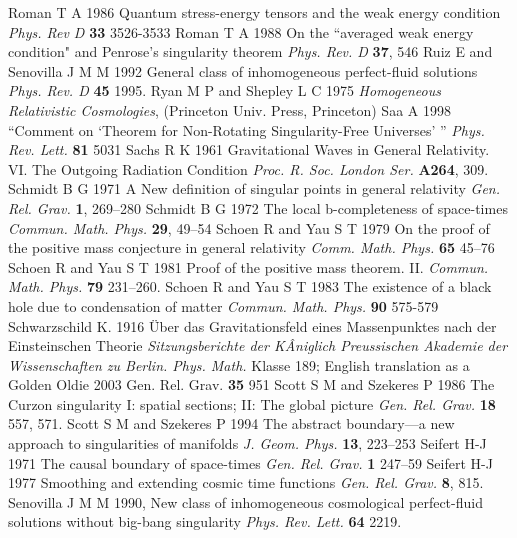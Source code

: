 \documentclass[12pt]{iopart}
\begin{document}
\begin{thebibliography}{999}
 Roman T A 1986 Quantum stress-energy tensors and the weak energy condition {\it Phys. Rev D} {\bf 33} 3526-3533
 Roman T A 1988 On the ``averaged weak energy condition" and Penrose's singularity theorem {\it Phys. Rev. D} {\bf 37}, 546
 Ruiz E and Senovilla J M M 1992 General class of inhomogeneous perfect-fluid solutions {\it Phys. Rev. D} {\bf 45} 1995.
 Ryan M P and Shepley L C 1975 {\it Homogeneous
Relativistic Cosmologies}, (Princeton Univ. Press, Princeton)
 Saa A 1998 ``Comment on 
`Theorem for Non-Rotating Singularity-Free Universes' '' {\it 
Phys. Rev. Lett.} {\bf 81} 5031
 Sachs R K 1961 Gravitational Waves in General Relativity. VI. The Outgoing Radiation Condition {\it Proc. R. Soc. London Ser.} {\bf A264}, 309.
 Schmidt B G 1971 A New definition of singular points in general relativity {\it Gen. Rel. Grav.} {\bf 1}, 269--280%
 Schmidt B G 1972 The local b-completeness of space-times {\it Commun. Math. Phys.} {\bf 29},
49--54%
 Schoen R and Yau S T 1979 On the proof of the positive mass conjecture in general relativity {\it Comm. Math. Phys.} {\bf 65}  45--76
 Schoen R and Yau S T 1981 Proof of the positive mass theorem. II. 
{\it Commun. Math. Phys.} {\bf 79} 231--260. 
 Schoen R and Yau S T 1983 The existence of a black hole due to condensation of matter {\it Commun. Math. Phys.} {\bf 90} 575-579
 Schwarzschild K. 1916 \"Uber das Gravitationsfeld eines Massenpunktes nach der Einsteinschen Theorie {\it Sitzungsberichte der KÂniglich Preussischen Akademie der Wissenschaften
zu Berlin. Phys. Math.} Klasse 189; English translation as a Golden Oldie 2003
Gen. Rel. Grav. {\bf 35}  951 
 Scott S M and Szekeres P 1986 The Curzon singularity I: spatial sections; II: The global picture {\it Gen. Rel. Grav.} {\bf 18} 557, 571.%
 Scott S M and Szekeres P 1994 The abstract boundary---a new approach to singularities of manifolds {\it J. Geom. Phys.} {\bf 13},
223--253%
 Seifert H-J 1971 The causal boundary of space-times {\it Gen. Rel. Grav.} {\bf 1} 247--59
 Seifert H-J 1977 Smoothing and extending cosmic time functions {\it Gen. Rel. Grav.} {\bf 8}, 815.%
 Senovilla J M M 1990, New 
class of inhomogeneous cosmological perfect-fluid solutions without 
big-bang singularity {\it Phys. Rev. Lett.} {\bf 64} 2219.

\end{thebibliography}
\end{document}
